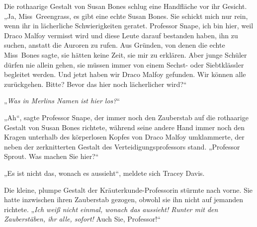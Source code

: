 Die rothaarige Gestalt von Susan Bones schlug eine Handfläche vor ihr Gesicht.
„Ja, Miss~Greengrass, es gibt eine echte Susan Bones. Sie schickt mich nur rein, wenn ihr in lächerliche Schwierigkeiten geratet. Professor Snape, ich bin hier, weil Draco Malfoy vermisst wird und diese Leute darauf bestanden haben, ihn zu suchen, anstatt die Auroren zu rufen. Aus Gründen, von denen die echte Miss~Bones sagte, sie hätten keine Zeit, sie mir zu erklären. Aber junge Schüler dürfen nie allein gehen, sie müssen immer von einem Sechst- oder Siebtklässler begleitet werden. Und jetzt haben wir Draco Malfoy gefunden. Wir können alle zurückgehen. Bitte? Bevor das hier noch lächerlicher wird?“

„\emph{Was in Merlins Namen ist hier los?}“

„Ah“, sagte Professor Snape, der immer noch den Zauberstab auf die rothaarige Gestalt von Susan Bones richtete, während seine andere Hand immer noch den Kragen unterhalb des körperlosen Kopfes von Draco Malfoy umklammerte, der neben der zerknitterten Gestalt des Verteidigungsprofessors stand.
„Professor Sprout. Was machen Sie hier?“

„Es ist nicht das, wonach es aussieht“, meldete sich Tracey Davis.

Die kleine, plumpe Gestalt der Kräuterkunde-Professorin stürmte nach vorne. Sie hatte inzwischen ihren Zauberstab gezogen, obwohl sie ihn nicht auf jemanden richtete.
„\emph{Ich weiß nicht einmal, wonach das aussieht! \emph{Runter mit den Zauberstäben}, ihr alle, sofort!} Auch Sie, Professor!“


